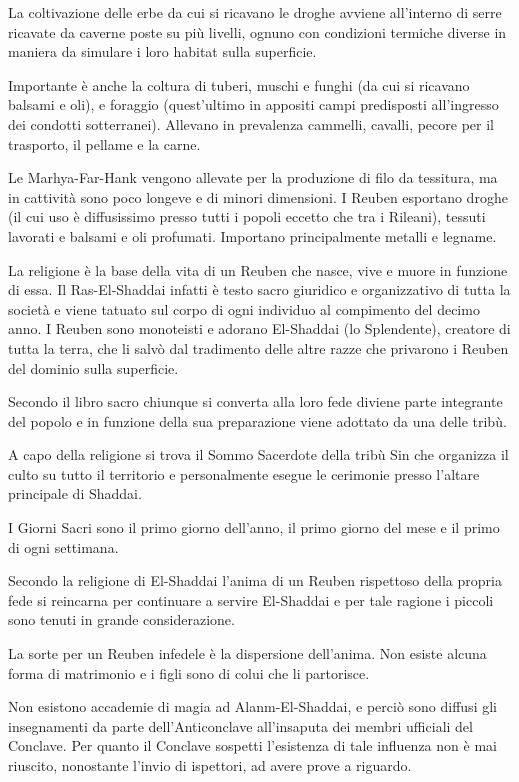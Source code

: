La coltivazione delle erbe da cui si ricavano le droghe
avviene all'interno di serre ricavate da caverne poste su pi\`u
livelli, ognuno con condizioni termiche diverse in maniera da simulare
i loro habitat sulla superficie. 

Importante \`e anche la coltura di tuberi, muschi e funghi (da cui
si ricavano balsami e oli), e foraggio (quest'ultimo in appositi campi
predisposti all'ingresso dei condotti sotterranei). Allevano in
prevalenza cammelli, cavalli, pecore per il trasporto, il pellame e la
carne.

 Le Marhya-Far-Hank vengono allevate
per la produzione di filo da tessitura, ma in cattivit\`a sono poco
longeve e di minori dimensioni. I Reuben esportano droghe (il cui uso
\`e diffusissimo presso tutti i popoli eccetto che tra i
Rileani), tessuti lavorati e balsami e oli profumati. Importano
principalmente metalli e legname.

\Religione La religione \`e la base della vita di un Reuben che nasce, vive e
muore in funzione di essa. Il Ras-El-Shaddai infatti \`e testo sacro
giuridico e organizzativo di tutta la societ\`a e viene tatuato sul
corpo di ogni individuo al compimento del decimo anno. I Reuben sono
monoteisti e adorano El-Shaddai (lo Splendente), creatore di tutta la
terra, che li salv\`o dal tradimento delle altre razze che
privarono i Reuben del dominio sulla superficie.

Secondo il libro sacro chiunque si converta alla loro fede diviene
parte integrante del popolo e in funzione della sua preparazione viene
adottato da una delle trib\`u.

A capo della religione si trova il Sommo Sacerdote della trib\`u Sin
che organizza il culto su tutto il territorio e personalmente esegue
le cerimonie presso l'altare principale di Shaddai.

I Giorni Sacri sono il primo giorno dell'anno, il primo giorno del
mese e il primo di ogni settimana.

Secondo la religione di El-Shaddai l'anima di un Reuben rispettoso
della propria fede si reincarna per continuare a servire El-Shaddai e
per tale ragione i piccoli sono tenuti in grande considerazione. 

La sorte per un Reuben infedele \`e la dispersione dell'anima. Non
esiste alcuna forma di matrimonio e i figli sono di colui che li
partorisce.

\Magia Non esistono accademie di magia ad Alanm-El-Shaddai, e perci\`o
sono diffusi gli insegnamenti da parte dell'Anticonclave all'insaputa
dei membri ufficiali del Conclave. Per quanto il Conclave sospetti
l'esistenza di tale influenza non \`e mai riuscito, nonostante l'invio
di ispettori, ad avere prove a riguardo.

